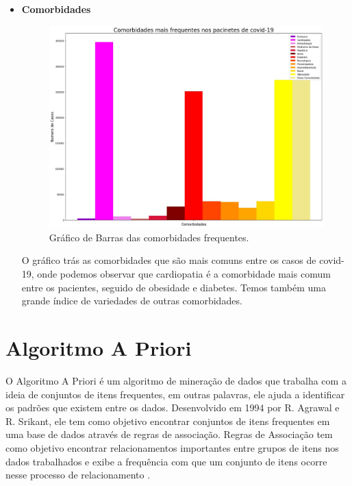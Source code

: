 \documentclass[tcc1]{uftex}
\begin{document}
\begin{itemize}
    \item\textbf{Comorbidades}
    \begin{figure}[h]
    \centering
    \includegraphics[width=11cm]{Comorbidade_solo.jpg} %
    \caption{Gráfico de Barras das comorbidades frequentes.}
    \end{figure}
    
    O gráfico trás as comorbidades que são mais comuns entre os casos de covid-19, onde podemos observar que cardiopatia é a comorbidade mais comum entre os pacientes, seguido de obesidade e diabetes. Temos também uma grande índice de variedades de outras comorbidades. 
    
 
 
 \end{itemize}


    
\chapter{Algoritmo A Priori}

O Algoritmo A Priori é um algoritmo de mineração de dados que trabalha com a ideia de conjuntos de itens frequentes, em outras palavras, ele ajuda a identificar os padrões que existem entre os dados. Desenvolvido em 1994 por R. Agrawal e R. Srikant, ele tem como objetivo encontrar conjuntos de itens frequentes em uma base de dados através de regras de associação. Regras de Associação tem como objetivo encontrar relacionamentos importantes entre grupos de itens nos dados trabalhados e exibe a frequência com que um conjunto de itens ocorre nesse processo de relacionamento \cite{liu2010study}.
\end{document}
